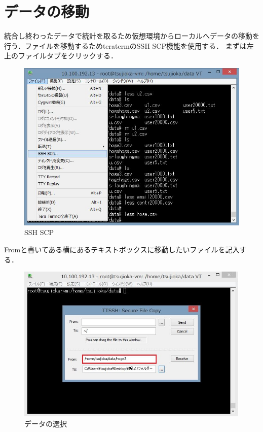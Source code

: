 \newpage

\section{データの移動}
統合し終わったデータで統計を取るため仮想環境からローカルへデータの移動を行う．ファイルを移動するためteratermのSSH SCP機能を使用する．
まずは左上のファイルタブをクリックする．

\begin{figure}[htb]
\centering
\includegraphics[width=14cm]{sshscp.JPG}
\caption{SSH SCP}\label{サンプル図}
\end{figure}

\newpage

Fromと書いてある横にあるテキストボックスに移動したいファイルを記入する．

\begin{figure}[htb]
\centering
\includegraphics[width=14cm]{sshscp2.JPG}
\caption{データの選択}\label{サンプル図}
\end{figure}

